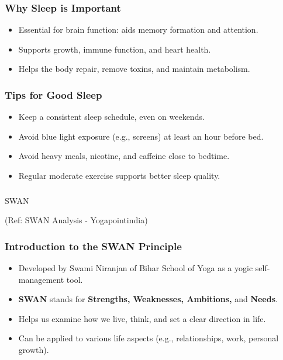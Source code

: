 \begin{frame}[fragile]\frametitle{Why Sleep is Important}
    \begin{itemize}
        \item Essential for brain function: aids memory formation and attention.
        \item Supports growth, immune function, and heart health.
        \item Helps the body repair, remove toxins, and maintain metabolism.
    \end{itemize}
\end{frame}

\begin{frame}[fragile]\frametitle{Tips for Good Sleep}
    \begin{itemize}
        \item Keep a consistent sleep schedule, even on weekends.
        \item Avoid blue light exposure (e.g., screens) at least an hour before bed.
        \item Avoid heavy meals, nicotine, and caffeine close to bedtime.
        \item Regular moderate exercise supports better sleep quality.
    \end{itemize}
\end{frame}

\begin{frame}[fragile]\frametitle{}
\begin{center}
{\Large SWAN}

(Ref: SWAN Analysis - Yogapointindia)
\end{center}
\end{frame}

\begin{frame}[fragile]\frametitle{Introduction to the SWAN Principle}
    \begin{itemize}
        \item Developed by Swami Niranjan of Bihar School of Yoga as a yogic self-management tool.
        \item \textbf{SWAN} stands for \textbf{Strengths, Weaknesses, Ambitions,} and \textbf{Needs}.
        \item Helps us examine how we live, think, and set a clear direction in life.
        \item Can be applied to various life aspects (e.g., relationships, work, personal growth).
    \end{itemize}
\end{frame}

